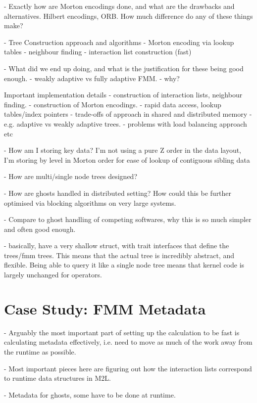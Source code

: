 - Exactly how are Morton encodings done, and what are the drawbacks and alternatives. Hilbert encodings, ORB. How much difference do any of these things make?

- Tree Construction approach and algorithms
    - Morton encoding via lookup tables
    - neighbour finding
    - interaction list construction (fast)

- What did we end up doing, and what is the justification for these being good enough.
    - weakly adaptive vs fully adaptive FMM.
    - why?

Important implementation details
    - construction of interaction lists, neighbour finding.
    - construction of Morton encodings.
    - rapid data access, lookup tables/index pointers
    - trade-offs of approach in shared and distributed memory
        - e.g. adaptive vs weakly adaptive trees.
        - problems with load balancing approach etc

- How am I storing key data? I'm not using a pure Z order in the data layout, I'm storing by level in Morton order for ease of lookup of contiguous sibling data

- How are multi/single node trees designed?

- How are ghosts handled in distributed setting? How could this be further optimised via blocking algorithms on very large systems.

- Compare to ghost handling of competing softwares, why this is so much simpler and often good enough.

- basically, have a very shallow struct, with trait interfaces that define the trees/fmm trees. This means that the actual tree is incredibly abstract, and flexible. Being able to query it like a single node tree means that kernel code is largely unchanged for operators.

\section{Case Study: FMM Metadata}\label{chpt:software_design:sec:metadata}

- Arguably the most important part of setting up the calculation to be fast is calculating metadata effectively, i.e. need to move as much of the work away from the runtime as possible.

- Most important pieces here are figuring out how the interaction lists correspond to runtime data structures in M2L.

- Metadata for ghosts, some have to be done at runtime.



